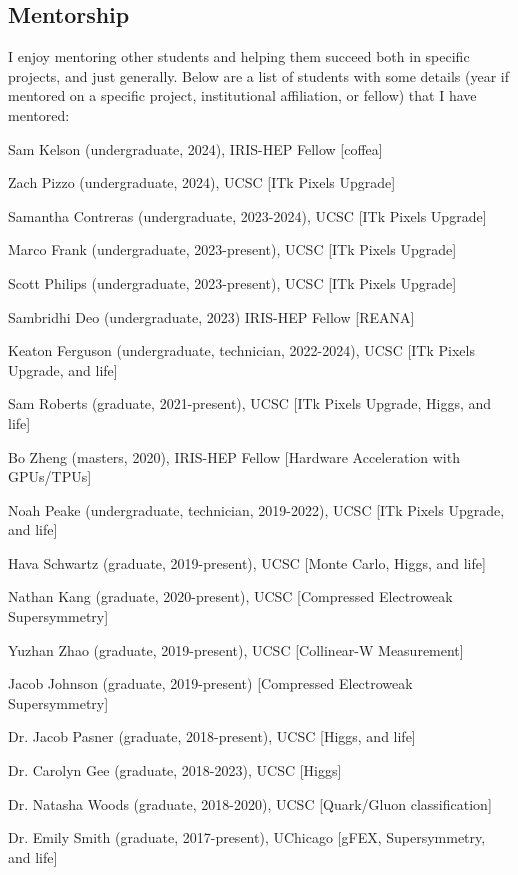 \documentclass[margin,line]{resume}
\let\origsection\section%
\let\section\subsection%
\let\section\origsection%
\begin{document}
\begin{resume}
\section{\mysidestyle Mentorship}
I enjoy mentoring other students and helping them succeed both in specific projects, and just generally. Below are a list of students with some details (year if mentored on a specific project, institutional affiliation, or fellow) that I have mentored:
\begin{list2}
  \item Sam Kelson (undergraduate, 2024), IRIS-HEP Fellow [coffea]
  \item Zach Pizzo (undergraduate, 2024), UCSC [ITk Pixels Upgrade]
  \item Samantha Contreras (undergraduate, 2023-2024), UCSC [ITk Pixels Upgrade]
  \item Marco Frank (undergraduate, 2023-present), UCSC [ITk Pixels Upgrade]
  \item Scott Philips (undergraduate, 2023-present), UCSC [ITk Pixels Upgrade]
  \item Sambridhi Deo (undergraduate, 2023) IRIS-HEP Fellow [REANA]
  \item Keaton Ferguson (undergraduate, technician, 2022-2024), UCSC [ITk Pixels Upgrade, and life]
  \item Sam Roberts (graduate, 2021-present), UCSC [ITk Pixels Upgrade, Higgs, and life]
  \item Bo Zheng (masters, 2020), IRIS-HEP Fellow [Hardware Acceleration with GPUs/TPUs]
  \item Noah Peake (undergraduate, technician, 2019-2022), UCSC [ITk Pixels Upgrade, and life]
  \item Hava Schwartz (graduate, 2019-present), UCSC [Monte Carlo, Higgs, and life]
  \item Nathan Kang (graduate, 2020-present), UCSC [Compressed Electroweak Supersymmetry]
  \item Yuzhan Zhao (graduate, 2019-present), UCSC [Collinear-W Measurement]
  \item Jacob Johnson (graduate, 2019-present) [Compressed Electroweak Supersymmetry]
  \item Dr. Jacob Pasner (graduate, 2018-present), UCSC [Higgs, and life]
  \item Dr. Carolyn Gee (graduate, 2018-2023), UCSC [Higgs]
  \item Dr. Natasha Woods (graduate, 2018-2020), UCSC [Quark/Gluon classification]
  \item Dr. Emily Smith (graduate, 2017-present), UChicago [gFEX, Supersymmetry, and life]

\end{list2}
\end{resume}
\end{document}
